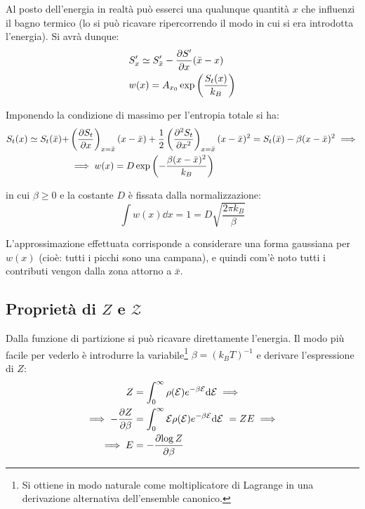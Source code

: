 Al posto dell'energia in realtà può esserci una qualunque quantità $x$ che influenzi il bagno termico (lo si può ricavare ripercorrendo il modo in cui si era introdotta l'energia). Si avrà dunque:
\begin{align*}
&S'_x \simeq S'_{\bar{x}} - \frac{\partial {S'}}{\partial {x}}(\bar{x} - x)\\
&w(x) = A_{x_0} \exp \left(\frac{S_t(x)}{k_B}\right)
\end{align*}

\noindent Imponendo la condizione di massimo per l'entropia totale si ha:
\begin{align*}
S_t(x) \simeq S_t(\bar{x}) + &\left(\frac{\partial {S_t}}{\partial {x}}\right)_{x=\bar{x}}(x - \bar{x}) + \frac{1}{2} \left(\frac{\partial {^2 S_t}}{\partial {x^2}}\right)_{x=\bar{x}}(x - \bar{x})^2 = S_t(\bar{x}) - \beta(x - \bar{x})^2 \implies\\
&\implies w(x) = D \exp \left(-\frac{\beta(x - \bar{x})^2}{k_B}\right)
\end{align*}

\noindent in cui $\beta \geq 0$ e la costante $D$ è fissata dalla normalizzazione:
\begin{equation*}
\int w(x) \dd x = 1 = D \sqrt{\frac{2 \pi k_B}{\beta}}
\end{equation*}

L'approssimazione effettuata corrisponde a considerare una forma gaussiana per $w(x)$ (cioè: tutti i picchi sono una campana), e quindi com'è noto tutti i contributi vengon dalla zona attorno a $\bar{x}$.

\subsection{Proprietà di $Z$ e $\mathcal{Z}$}

Dalla funzione di partizione si può ricavare direttamente l'energia. Il modo più facile per vederlo è introdurre la variabile\footnote{Si ottiene in modo naturale come moltiplicatore di Lagrange in una derivazione alternativa dell'ensemble canonico.} $\beta = (k_B T)^{-1}$ e derivare l'espressione di $Z$:
\begin{align*}
Z &= \int_{0}^{\infty} \rho(\mathcal{E}) e^{-\beta \mathcal{E}}\dd \mathcal{E} \implies\\
\implies - \frac{\partial {Z}}{\partial {\beta}} &= \int_{0}^{\infty} \mathcal{E}\rho(\mathcal{E}) e^{-\beta \mathcal{E}}\dd \mathcal{E}\ = Z E \implies\\
\implies E &= - \frac{\partial {\log Z}}{\partial {\beta}}
\end{align*}


